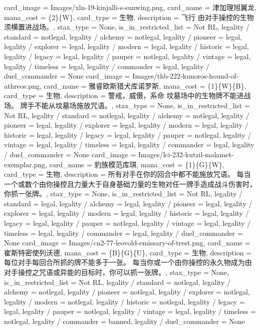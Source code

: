 \documentclass[lang = cn, color = black, 10pt]{AllThatStax}
\begin{document}
{
	card_image = Images/xln-19-kinjalli-s-sunwing.png,
	card_name = 津加理旭翼龙,
	mana_cost = \{2\}\{W\},
	card_type = 生物,
	description = 飞行
	由对手操控的生物须横置进战场。,
	stax_type = None,
	is_in_restricted_list = Not RL,
	legality / standard = notlegal,
	legality / alchemy = notlegal,
	legality / pioneer = legal,
	legality / explorer = legal,
	legality / modern = legal,
	legality / historic = legal,
	legality / legacy = legal,
	legality / pauper = notlegal,
	legality / vintage = legal,
	legality / timeless = legal,
	legality / commander = legal,
	legality / duel_commander = None
}
\card
{
	card_image = Images/thb-222-kunoros-hound-of-athreos.png,
	card_name = 雅睿欧斯猎犬库诺罗斯,
	mana_cost = \{1\}\{W\}\{B\},
	card_type = 生物,
	description = 警戒，威慑，系命
	坟墓场中的生物牌不能进战场。
	牌手不能从坟墓场施放咒语。,
	stax_type = None,
	is_in_restricted_list = Not RL,
	legality / standard = notlegal,
	legality / alchemy = notlegal,
	legality / pioneer = legal,
	legality / explorer = legal,
	legality / modern = legal,
	legality / historic = legal,
	legality / legacy = legal,
	legality / pauper = notlegal,
	legality / vintage = legal,
	legality / timeless = legal,
	legality / commander = legal,
	legality / duel_commander = None
}
\card
{
	card_image = Images/lci-232-kutzil-malamet-exemplar.png,
	card_name = 豹族模范库琪,
	mana_cost = \{1\}\{G\}\{W\},
	card_type = 生物,
	description = 所有对手在你的回合中都不能施放咒语。
	每当一个或数个由你操控且力量大于自身基础力量的生物对任一牌手造成战斗伤害时，你抓一张牌。,
	stax_type = None,
	is_in_restricted_list = Not RL,
	legality / standard = legal,
	legality / alchemy = legal,
	legality / pioneer = legal,
	legality / explorer = legal,
	legality / modern = legal,
	legality / historic = legal,
	legality / legacy = legal,
	legality / pauper = notlegal,
	legality / vintage = legal,
	legality / timeless = legal,
	legality / commander = legal,
	legality / duel_commander = None
}
\card
{
	card_image = Images/cn2-77-leovold-emissary-of-trest.png,
	card_name = 崔斯特密使列沃德,
	mana_cost = \{B\}\{G\}\{U\},
	card_type = 生物,
	description = 每位对手每回合所抓的牌不能多于一张。
	每当你或一个由你操控的永久物成为由对手操控之咒语或异能的目标时，你可以抓一张牌。,
	stax_type = None,
	is_in_restricted_list = Not RL,
	legality / standard = notlegal,
	legality / alchemy = notlegal,
	legality / pioneer = notlegal,
	legality / explorer = notlegal,
	legality / modern = notlegal,
	legality / historic = notlegal,
	legality / legacy = legal,
	legality / pauper = notlegal,
	legality / vintage = legal,
	legality / timeless = notlegal,
	legality / commander = banned,
	legality / duel_commander = None
}
\end{document}
